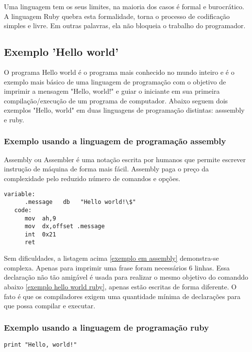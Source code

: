 \documentclass[12pt]{article}
\begin{document}
Uma linguagem tem os seus limites, na maioria dos casos é formal e burocrático. A linguagem Ruby quebra esta formalidade, torna o processo de codificação simples e livre. Em outras palavras, ela não bloqueia o trabalho do programador.

\subsection{Exemplo 'Hello world'}

   O programa Hello world é o programa mais conhecido no mundo inteiro e é o exemplo mais básico de uma linguagem de programação com o objetivo de imprimir a mensagem "Hello, world!" e guiar o iniciante em sua primeira compilação/execução de um programa de computador. Abaixo seguem dois exemplos "Hello, world" em duas linguagens de programação distintas: asssembly e ruby.


\subsubsection {Exemplo usando a linguagem de programação assembly}

Assembly ou Assembler é uma notação escrita por humanos que permite escrever instrução de máquina de forma mais fácil. Assembly paga o preço da complexidade pelo reduzido número de comandos e opções.

\begin{lstlisting}[label=exemplo em assembly,caption=Exemplo em assembly]
   variable:
      .message   db   "Hello world!\$"
   code:
      mov  ah,9
      mov  dx,offset .message
      int  0x21
      ret
\end{lstlisting}

Sem dificuldades, a listagem acima \ref{exemplo em assembly} demonstra-se complexa. Apenas para imprimir uma frase foram necessários 6 linhas. Essa declaração não tão amigável é usada para realizar o mesmo objetivo do comanddo abaixo \ref{exemplo hello world ruby}, apenas estão escritas de forma diferente. O fato é que os compiladores exigem uma quantidade mínima de declarações para que possa compilar e executar.


\subsubsection {Exemplo usando a linguagem de programação ruby}

\begin{lstlisting}[caption=Exemplo em ruby]
   print "Hello, world!"
\end{lstlisting}
\end{document}
